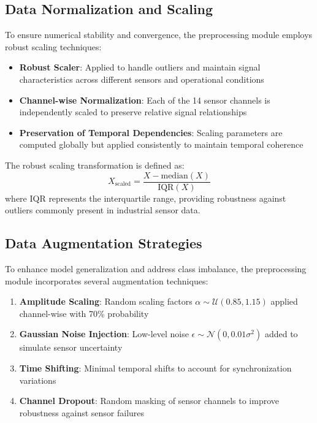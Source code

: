\subsection{Data Normalization and Scaling}
\label{subsec:normalization}

To ensure numerical stability and convergence, the preprocessing module employs robust scaling techniques:

\begin{itemize}
    \item \textbf{Robust Scaler}: Applied to handle outliers and maintain signal characteristics across different sensors and operational conditions
    \item \textbf{Channel-wise Normalization}: Each of the 14 sensor channels is independently scaled to preserve relative signal relationships
    \item \textbf{Preservation of Temporal Dependencies}: Scaling parameters are computed globally but applied consistently to maintain temporal coherence
\end{itemize}

The robust scaling transformation is defined as:
\begin{equation}
X_{\text{scaled}} = \frac{X - \text{median}(X)}{\text{IQR}(X)}
\end{equation}
where IQR represents the interquartile range, providing robustness against outliers commonly present in industrial sensor data.

\subsection{Data Augmentation Strategies}
\label{subsec:data_augmentation}

To enhance model generalization and address class imbalance, the preprocessing module incorporates several augmentation techniques:

\begin{enumerate}
    \item \textbf{Amplitude Scaling}: Random scaling factors $\alpha \sim \mathcal{U}(0.85, 1.15)$ applied channel-wise with 70\% probability
    \item \textbf{Gaussian Noise Injection}: Low-level noise $\epsilon \sim \mathcal{N}(0, 0.01\sigma^2)$ added to simulate sensor uncertainty  
    \item \textbf{Time Shifting}: Minimal temporal shifts to account for synchronization variations
    \item \textbf{Channel Dropout}: Random masking of sensor channels to improve robustness against sensor failures
\end{enumerate}

